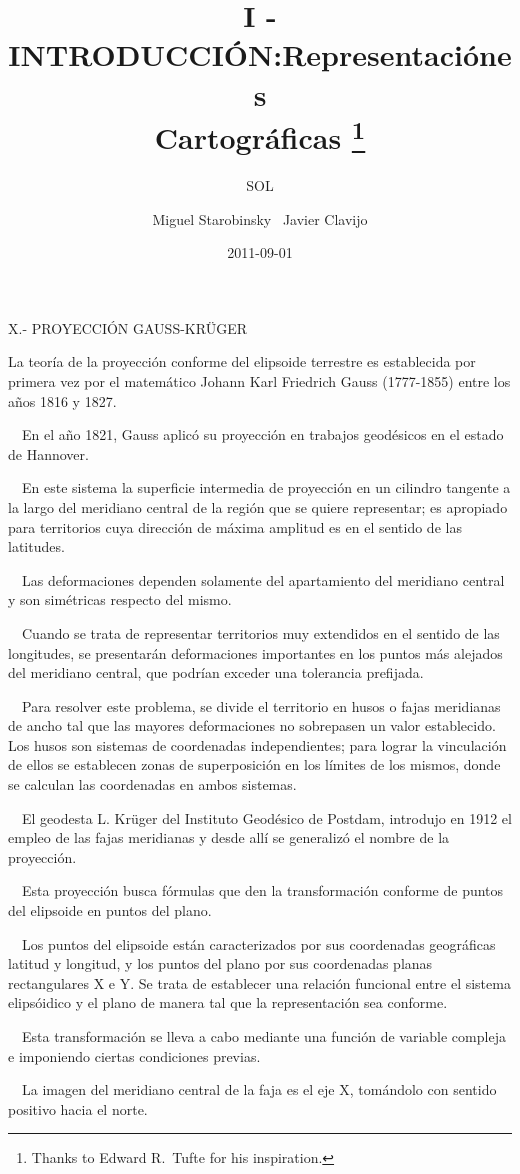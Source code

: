 \documentclass{tufte-book}
\title{I - INTRODUCCIÓN:}
\author{SOL}
\date{2011-09-01}
\title{Representaciónes \\ Cartográficas \thanks{Thanks to Edward R.~Tufte for his inspiration.}}
\author[Miguel Starobinsky \ Javier Clavijo]{Miguel Starobinsky \ Javier Clavijo}
\begin{document}
X.- PROYECCIÓN GAUSS-KR\"UGER

La teoría de la proyección conforme del elipsoide terrestre es
establecida por primera vez por el matemático Johann Karl Friedrich
Gauss (1777-1855) entre los a\~nos 1816 y 1827.

\ \ En el a\~no 1821, Gauss aplicó su proyección en trabajos
geodésicos en el estado de Hannover.

\ \ En este sistema la superficie intermedia de proyección en un
cilindro tangente a la largo del meridiano central de la región que
se quiere representar; es apropiado para territorios cuya dirección
de máxima amplitud es en el sentido de las latitudes.

\ \ Las deformaciones dependen solamente del apartamiento del meridiano
central y son simétricas respecto del mismo.

\ \ Cuando se trata de representar territorios muy extendidos en el
sentido de las longitudes, se presentarán deformaciones importantes
en los puntos más alejados del meridiano central, que podrían
exceder una tolerancia prefijada.

\ \ Para resolver este problema, se divide el territorio en husos o
fajas meridianas de ancho tal que las mayores deformaciones no
sobrepasen un valor establecido. Los husos son sistemas de coordenadas
independientes; para lograr la vinculación de ellos se establecen
zonas de superposición en los límites de los mismos, donde se
calculan las coordenadas en ambos sistemas.

\ \ El geodesta L. Kr\"uger del Instituto Geodésico de Postdam,
introdujo en 1912 el empleo de las fajas meridianas y desde allí se 
generalizó el nombre de la proyección.

\ \ Esta proyección busca fórmulas que den la transformación
conforme de puntos del elipsoide en puntos del plano.

\ \ Los puntos del elipsoide están caracterizados por sus coordenadas
geográficas latitud y longitud, y los puntos del plano por sus
coordenadas planas rectangulares X e Y. Se trata de establecer una
relación funcional entre el sistema elipsóidico y el plano de
manera tal que la representación sea conforme.

\ \ Esta transformación se lleva a cabo mediante una función de
variable compleja e imponiendo ciertas condiciones previas.

\ \ La imagen del meridiano central de la faja es el eje X, tomándolo
con sentido positivo hacia el norte.
\end{document}
